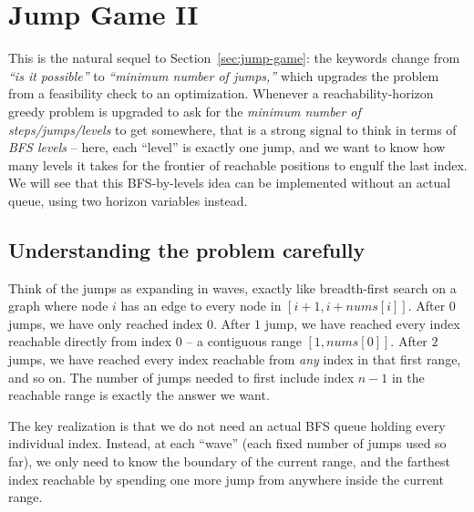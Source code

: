 \section{Jump Game II}
\label{sec:jump-game-2}


\begin{patternbox}
This is the natural sequel to Section~\ref{sec:jump-game}: the keywords
change from \emph{``is it possible''} to \emph{``minimum number of
jumps,''} which upgrades the problem from a feasibility check to an
optimization. Whenever a reachability-horizon greedy problem is upgraded to
ask for the \emph{minimum number of steps/jumps/levels} to get somewhere,
that is a strong signal to think in terms of \emph{BFS levels} -- here,
each ``level'' is exactly one jump, and we want to know how many levels it
takes for the frontier of reachable positions to engulf the last index. We
will see that this BFS-by-levels idea can be implemented without an actual
queue, using two horizon variables instead.
\end{patternbox}

\subsection*{Understanding the problem carefully}

Think of the jumps as expanding in waves, exactly like breadth-first search
on a graph where node $i$ has an edge to every node in
$[i+1, i+\textit{nums}[i]]$. After $0$ jumps, we have only reached index $0$.
After $1$ jump, we have reached every index reachable directly from index
$0$ -- a contiguous range $[1, \textit{nums}[0]]$. After $2$ jumps, we have
reached every index reachable from \emph{any} index in that first range, and
so on. The number of jumps needed to first include index $n-1$ in the
reachable range is exactly the answer we want.

The key realization is that we do not need an actual BFS queue holding every
individual index. Instead, at each ``wave'' (each fixed number of jumps used
so far), we only need to know the boundary of the current range, and the
farthest index reachable by spending one more jump from anywhere inside the
current range.

